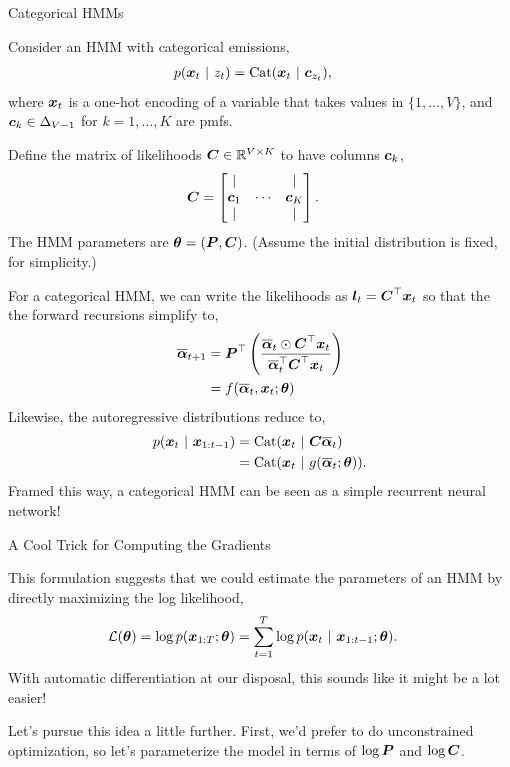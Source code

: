 \documentclass[aspectratio=169]{beamer}
\begin{document}
\begin{frame}[t,allowframebreaks]{Categorical HMMs}\label{categorical-hmms}

Consider an HMM with categorical emissions, 
\begin{align*}
p(\boldsymbol{x}_t ~\vert~ z_t) &= \mathrm{Cat}(\boldsymbol{x}_t ~\vert~ \boldsymbol{c}_{z_t}),
\end{align*} 
where \(\boldsymbol{x}_t\) is a one-hot encoding of a variable that
takes values in \(\{1,\ldots,V\}\), and \(\boldsymbol{c}_k \in \Delta_{V-1}\) for
\(k=1,\ldots,K\) are pmfs. 

Define the matrix of likelihoods
\(\boldsymbol{C} \in \mathbb{R}^{V \times K}\) to have columns \(\boldsymbol{c}_k\),
\begin{align*}
\boldsymbol{C} &=
\begin{bmatrix}
| & & | \\
\boldsymbol{c}_1 & \cdots & \boldsymbol{c}_K \\
| & & | 
\end{bmatrix}.
\end{align*} 
The HMM parameters are \(\boldsymbol{\theta} = (\boldsymbol{P}, \boldsymbol{C})\). (Assume
the initial distribution is fixed, for simplicity.)

For a categorical HMM, we can write the likelihoods as
\(\boldsymbol{l}_t = \boldsymbol{C}^\top \boldsymbol{x}_t\) so that the the forward recursions
simplify to, 
\begin{align*}
\overline{\boldsymbol{\alpha}}_{t+1} 
&= \boldsymbol{P}^\top \left( \frac{\overline{\boldsymbol{\alpha}}_t \odot \boldsymbol{C}^\top \boldsymbol{x}_t}{\overline{\boldsymbol{\alpha}}_t^\top \boldsymbol{C}^\top \boldsymbol{x}_t} \right) \\
&= f(\overline{\boldsymbol{\alpha}}_t, \boldsymbol{x}_t; \boldsymbol{\theta})
\end{align*}
 Likewise, the autoregressive distributions reduce to,
\begin{align*}
p(\boldsymbol{x}_t ~\vert~ \boldsymbol{x}_{1:t-1}) 
&= \mathrm{Cat}(\boldsymbol{x}_t ~\vert~ \boldsymbol{C} \overline{\boldsymbol{\alpha}}_t) \\
&= \mathrm{Cat}(\boldsymbol{x}_t ~\vert~ g(\overline{\boldsymbol{\alpha}}_t; \boldsymbol{\theta})).
\end{align*} 
Framed this way, a categorical HMM can be seen as a simple
recurrent neural network!
\end{frame}

\begin{frame}[t,allowframebreaks]{A Cool Trick for Computing the
Gradients}\label{a-cool-trick-for-computing-the-gradients}

This formulation suggests that we could estimate the parameters of an
HMM by directly maximizing the log likelihood, 
\begin{align*}
\mathcal{L}(\boldsymbol{\theta}) &= \log p(\boldsymbol{x}_{1:T}; \boldsymbol{\theta}) = \sum_{t=1}^T \log p(\boldsymbol{x}_t ~\vert~ \boldsymbol{x}_{1:t-1}; \boldsymbol{\theta}).
\end{align*} 
With automatic differentiation at our disposal, this sounds
like it might be a lot easier!

Let's pursue this idea a little further. First, we'd prefer to do
unconstrained optimization, so let's parameterize the model in terms of
\(\log \boldsymbol{P}\) and \(\log \boldsymbol{C}\). 
\end{frame}
\end{document}
